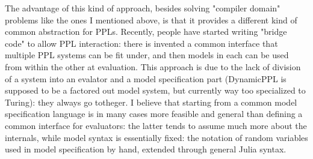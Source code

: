 The advantage of this kind of approach, besides solving "compiler domain" problems like the ones I
mentioned above, is that it provides a different kind of common abstraction for PPLs. Recently,
people have started writing "bridge code" to allow PPL interaction: there is invented a common
interface that multiple PPL systems can be fit under, and then models in each can be used from
within the other at evaluation. This approach is due to the lack of division of a system into an
evalator and a model specification part (DynamicPPL is supposed to be a factored out model system,
but currently way too specialized to Turing): they always go totheger. I believe that starting from
a common model specification language is in many cases more feasible and general than defining a
common interface for evaluators: the latter tends to assume much more about the internals, while
model syntax is essentially fixed: the notation of random variables used in model specification by
hand, extended through general Julia syntax.







